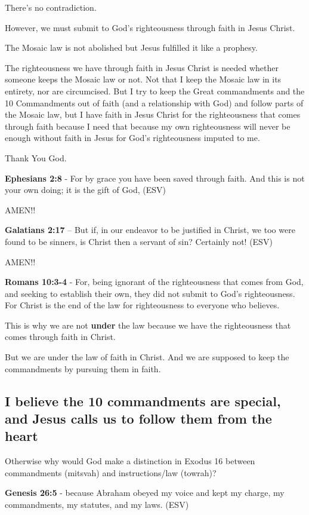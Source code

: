 \documentclass[11pt]{article}
\begin{document}
There's no contradiction.

However, we must submit to God's righteousness through faith in Jesus Christ.

The Mosaic law is not abolished but Jesus fulfilled it like a prophesy.

The righteousness we have through faith in Jesus Christ is needed whether someone keeps the Mosaic law or not.
Not that I keep the Mosaic law in its entirety, nor are circumcised. But I try to keep the Great commandments
and the 10 Commandments out of faith (and a relationship with God) and follow parts of the Mosaic law,
but I have faith in Jesus Christ for the righteousness that comes through faith because I need that because my own
righteousness will never be enough without faith in Jesus for God's righteousness imputed to me.

Thank You God.

\textbf{Ephesians 2:8} - For by grace you have been saved through faith. And this is not your own doing; it is the gift of God, (ESV)

AMEN!!

\textbf{Galatians 2:17} -- But if, in our endeavor to be justified in Christ, we too were found to be sinners, is Christ then a servant of sin? Certainly not! (ESV)

AMEN!!

\textbf{Romans 10:3-4} - For, being ignorant of the righteousness that comes from God, and seeking to establish their own, they did not submit to God's righteousness. For Christ is the end of the law for righteousness to everyone who believes.

This is why we are not \textbf{under} the law because we have the righteousness that comes through faith in Christ.

But we are under the law of faith in Christ.
And we are supposed to keep the commandments by pursuing them in faith.

\subsection{I believe the 10 commandments are special, and Jesus calls us to follow them from the heart}
\label{sec:org15bbe6c}
Otherwise why would God make a distinction in Exodus 16 between commandments (mitsvah) and instructions/law (towrah)?

\textbf{Genesis 26:5} - because Abraham obeyed my voice and kept my charge, my commandments, my statutes, and my laws. (ESV)
\end{document}
